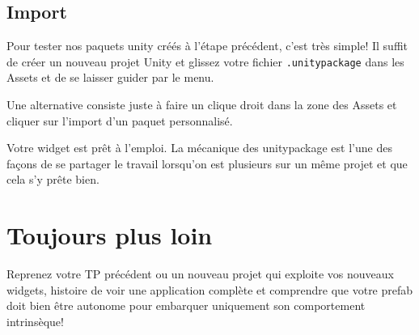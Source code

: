 \documentclass[a4paper,10pt]{article}
\newenvironment{info}%
{\begin{tcolorbox}[breakable,colback=green!5!white,colframe=green!75!black,title=Information]}%
{\end{tcolorbox}}
\begin{document}
\subsection{Import}

Pour tester nos paquets unity créés à l'étape précédent, c'est très simple! Il suffit de créer un nouveau projet Unity et glissez votre fichier \texttt{.unitypackage} dans les Assets et de se laisser guider par le menu.

\begin{info}
Une alternative consiste juste à faire un clique droit dans la zone des Assets et cliquer sur l'import d'un paquet personnalisé.
\end{info}

Votre widget est prêt à l'emploi. La mécanique des unitypackage est l'une des façons de se partager le travail lorsqu'on est plusieurs sur un même projet et que cela s'y prête bien. 

\section{Toujours plus loin}

Reprenez votre TP précédent ou un nouveau projet qui exploite vos nouveaux widgets, histoire de voir une application complète et comprendre que votre prefab doit bien être autonome pour embarquer uniquement son comportement intrinsèque!
\end{document}
